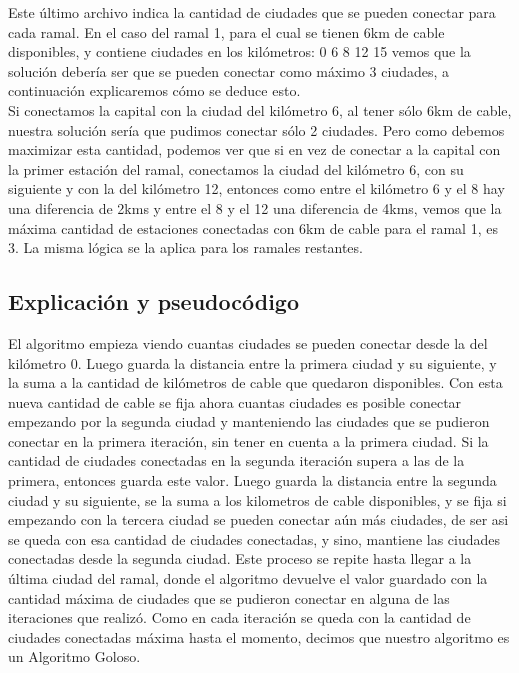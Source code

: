 Este último archivo indica la cantidad de ciudades que se pueden conectar para cada ramal. En el caso del ramal 1, para el cual se tienen 6km de cable disponibles, y contiene ciudades en los kilómetros: 0 6 8 12 15 vemos que la solución debería ser que se pueden conectar como máximo 3 ciudades, a continuación explicaremos cómo se deduce esto.\\

Si conectamos la capital con la ciudad del kilómetro 6, al tener sólo 6km de cable, nuestra solución sería que pudimos conectar sólo 2 ciudades. Pero como debemos maximizar esta cantidad, podemos ver que si en vez de conectar a la capital con la primer estación del ramal, conectamos la ciudad del kilómetro 6, con su siguiente y con la del kilómetro 12, entonces como entre el kilómetro 6 y el 8 hay una diferencia de 2kms y entre el 8 y el 12 una diferencia de 4kms, vemos que la máxima cantidad de estaciones conectadas con 6km de cable para el ramal 1, es 3. La misma lógica se la aplica para los ramales restantes.\\


\subsection{Explicación y pseudocódigo}

El algoritmo empieza viendo cuantas ciudades se pueden conectar desde la del kilómetro 0. Luego guarda la distancia entre la primera ciudad y su siguiente, y la suma a la cantidad de kilómetros de cable que quedaron disponibles. Con esta nueva cantidad de cable se fija ahora cuantas ciudades es posible conectar empezando por la segunda ciudad y manteniendo las ciudades que se pudieron conectar en la primera iteración, sin tener en cuenta a la primera ciudad. Si la cantidad de ciudades conectadas en la segunda iteración supera a las de la primera, entonces guarda este valor. Luego guarda la distancia entre la segunda ciudad y su siguiente, se la suma a los kilometros de cable disponibles, y se fija si empezando con la tercera ciudad se pueden conectar aún más ciudades, de ser asi se queda con esa cantidad de ciudades conectadas, y sino, mantiene las ciudades conectadas desde la segunda ciudad. Este proceso se repite hasta llegar a la última ciudad del ramal, donde el algoritmo devuelve el valor guardado con la cantidad máxima de ciudades que se pudieron conectar en alguna de las iteraciones que realizó. Como en cada iteración se queda con la cantidad de ciudades conectadas máxima hasta el momento, decimos que nuestro algoritmo es un Algoritmo Goloso.\\


